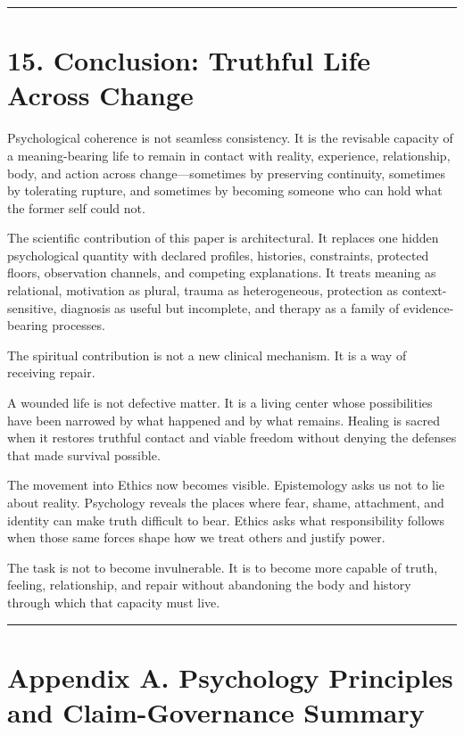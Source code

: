 \documentclass[
  11pt,
]{article}
\begin{document}
\begin{center}\rule{0.5\linewidth}{0.5pt}\end{center}

\section{15. Conclusion: Truthful Life Across
Change}\label{conclusion-truthful-life-across-change}

Psychological coherence is not seamless consistency. It is the revisable
capacity of a meaning-bearing life to remain in contact with reality,
experience, relationship, body, and action across change---sometimes by
preserving continuity, sometimes by tolerating rupture, and sometimes by
becoming someone who can hold what the former self could not.

The scientific contribution of this paper is architectural. It replaces
one hidden psychological quantity with declared profiles, histories,
constraints, protected floors, observation channels, and competing
explanations. It treats meaning as relational, motivation as plural,
trauma as heterogeneous, protection as context-sensitive, diagnosis as
useful but incomplete, and therapy as a family of evidence-bearing
processes.

The spiritual contribution is not a new clinical mechanism. It is a way
of receiving repair.

A wounded life is not defective matter. It is a living center whose
possibilities have been narrowed by what happened and by what remains.
Healing is sacred when it restores truthful contact and viable freedom
without denying the defenses that made survival possible.

The movement into Ethics now becomes visible. Epistemology asks us not
to lie about reality. Psychology reveals the places where fear, shame,
attachment, and identity can make truth difficult to bear. Ethics asks
what responsibility follows when those same forces shape how we treat
others and justify power.

The task is not to become invulnerable. It is to become more capable of
truth, feeling, relationship, and repair without abandoning the body and
history through which that capacity must live.

\begin{center}\rule{0.5\linewidth}{0.5pt}\end{center}

\section{Appendix A. Psychology Principles and Claim-Governance
Summary}\label{appendix-a.-psychology-principles-and-claim-governance-summary}
\end{document}
